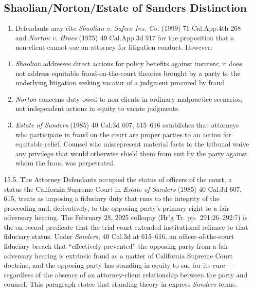 \subsection{Shaolian/Norton/Estate of Sanders Distinction}\label{shaoliannortonestate-of-sanders-distinction}

\begin{enumerate}
\def\labelenumi{\arabic{enumi}.}
\setcounter{enumi}{14}
\tightlist
\item
  Defendants may cite \emph{Shaolian v. Safeco Ins. Co.} (1999) 71 Cal.App.4th 268 and \emph{Norton v. Hines} (1975) 49 Cal.App.3d 917 for the proposition that a non-client cannot sue an attorney for litigation conduct. However:
\end{enumerate}

\begin{enumerate}
\def\labelenumi{(\alph{enumi})}
\item
  \emph{Shaolian} addresses direct actions for policy benefits against insurers; it does not address equitable fraud-on-the-court theories brought by a party to the underlying litigation seeking vacatur of a judgment procured by fraud.
\item
  \emph{Norton} concerns duty owed to non-clients in ordinary malpractice scenarios, not independent actions in equity to vacate judgments.
\item
  \emph{Estate of Sanders} (1985) 40 Cal.3d 607, 615--616 establishes that attorneys who participate in fraud on the court are proper parties to an action for equitable relief. Counsel who misrepresent material facts to the tribunal waive any privilege that would otherwise shield them from suit by the party against whom the fraud was perpetrated.
\end{enumerate}

15.5. The Attorney Defendants occupied the status of officers of the court, a status the California Supreme Court in \emph{Estate of Sanders} (1985) 40 Cal.3d 607, 615, treats as imposing a fiduciary duty that runs to the integrity of the proceeding and, derivatively, to the opposing party's primary right to a fair adversary hearing. The February 28, 2025 colloquy (Hr'g Tr. pp.~291:26--292:7) is the on-record predicate that the trial court extended institutional reliance to that fiduciary status. Under \emph{Sanders}, 40 Cal.3d at 615--616, an officer-of-the-court fiduciary breach that ``effectively prevented'' the opposing party from a fair adversary hearing is extrinsic fraud as a matter of California Supreme Court doctrine, and the opposing party has standing in equity to sue for its cure --- regardless of the absence of an attorney-client relationship between the party and counsel. This paragraph states that standing theory in express \emph{Sanders} terms.

